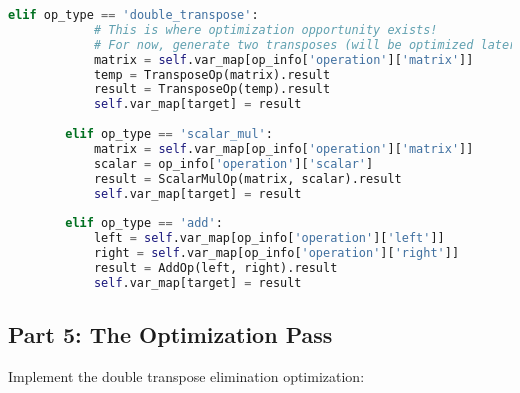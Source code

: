 \documentclass[11pt,a4paper]{article}
\begin{document}
\begin{lstlisting}[language=Python, caption=src/ir\_generator.py - IR Generation]
        elif op_type == 'double_transpose':
            # This is where optimization opportunity exists!
            # For now, generate two transposes (will be optimized later)
            matrix = self.var_map[op_info['operation']['matrix']]
            temp = TransposeOp(matrix).result
            result = TransposeOp(temp).result
            self.var_map[target] = result
        
        elif op_type == 'scalar_mul':
            matrix = self.var_map[op_info['operation']['matrix']]
            scalar = op_info['operation']['scalar']
            result = ScalarMulOp(matrix, scalar).result
            self.var_map[target] = result
        
        elif op_type == 'add':
            left = self.var_map[op_info['operation']['left']]
            right = self.var_map[op_info['operation']['right']]
            result = AddOp(left, right).result
            self.var_map[target] = result
\end{lstlisting}

\subsection{Part 5: The Optimization Pass}

Implement the double transpose elimination optimization:
\end{document}
